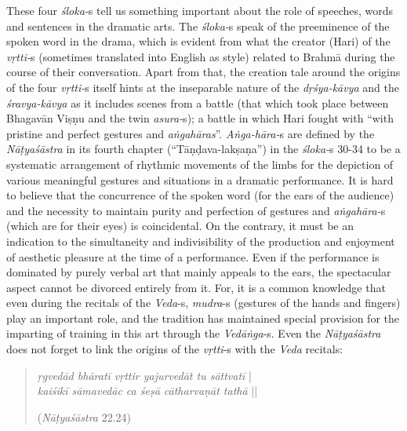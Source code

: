 These four \textsl{śloka-}s tell us something important about the role of speeches, words and sentences in the dramatic arts. The \textsl{śloka-}s speak of the preeminence of the spoken word in the drama, which is evident from what the creator (Hari) of the \textsl{vṛtti-}s (sometimes translated into English as style) related to Brahmā during the course of their conversation. Apart from that, the creation tale around the origins of the four \textsl{vṛtti-}s itself hints at the inseparable nature of the \textsl{dṛśya-kāvya} and the \textsl{śravya-kāvya} as it includes scenes from a battle (that which took place between Bhagavān Viṣṇu and the twin \hbox{\textsl{asura-}s}); a battle in which Hari fought with “with pristine and perfect gestures and \textsl{aṅgahāras}”. \textsl{Aṅga-hāra-}s are defined by the \textsl{Nāṭyaśāstra} in its fourth chapter (“Tāṇḍava-lakṣaṇa”) in the \textsl{śloka-}s 30-34 to be a systematic arrangement of rhythmic movements of the limbs for the depiction of various meaningful gestures and situations in a dramatic performance. It is hard to believe that the concurrence of the spoken word (for the ears of the audience) and the necessity to maintain purity and perfection of gestures and \textsl{aṅgahāra-}s (which are for their eyes) is coincidental. On the contrary, it must be an indication to the simultaneity and indivisibility of the production and enjoyment of aesthetic pleasure at the time of a performance. Even if the performance is dominated by purely verbal art that mainly appeals to the ears, the spectacular aspect cannot be divorced entirely from it. For, it is a common knowledge that even during the recitals of the \textsl{Veda}-s, \textsl{mudra}-s (gestures of the hands and fingers) play an important role, and the tradition has maintained special provision for the imparting of training in this art through the \textsl{Vedāṅga}-s. Even the \textsl{Nāṭyaśāstra} does not forget to link the origins of the \textsl{vṛtti}-s with the \textsl{Veda} recitals: 
\begin{quote}
\textsl{ṛgvedād bhāratī vṛttir yajurvedāt tu sāttvatī} |    \\
\textsl{kaiśikī sāmavedāc ca śeṣā cātharvaṇāt tathā} ||

\hfill(\textsl{Nāṭyaśāstra} 22.24)
\end{quote}

